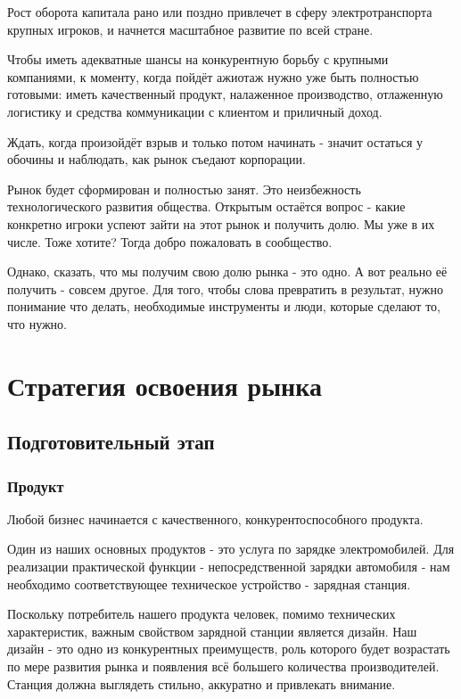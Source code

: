 \documentclass[a4paper,12pt]{report}
\begin{document}
Рост оборота капитала рано или поздно привлечет в сферу электротранспорта крупных игроков, и начнется масштабное развитие по всей стране.

Чтобы иметь адекватные шансы на конкурентную борьбу с крупными компаниями, к моменту, когда пойдёт ажиотаж нужно уже быть полностью готовыми: иметь качественный продукт, налаженное производство, отлаженную логистику и средства коммуникации с клиентом и приличный доход. 

Ждать, когда произойдёт взрыв и только потом начинать - значит остаться у обочины и наблюдать, как рынок съедают корпорации.

Рынок будет сформирован и полностью занят. Это неизбежность технологического развития общества. Открытым остаётся вопрос - какие конкретно игроки успеют зайти на этот рынок и получить долю. Мы уже в их числе. Тоже хотите? Тогда добро пожаловать в сообщество. 

Однако, сказать, что мы получим свою долю рынка - это одно. А вот реально её получить - совсем другое. Для того, чтобы слова превратить в результат, нужно понимание что делать, необходимые инструменты и люди, которые сделают то, что нужно. 


\chapter{Стратегия освоения рынка}

\section{Подготовительный этап}
\subsection{Продукт}

Любой бизнес начинается с качественного, конкурентоспособного продукта. 

Один из наших основных продуктов - это услуга по зарядке электромобилей. Для реализации практической функции - непосредственной зарядки автомобиля - нам необходимо соответствующее техническое устройство - зарядная станция. 

Поскольку потребитель нашего продукта человек, помимо технических характеристик, важным свойством зарядной станции является дизайн. Наш дизайн - это одно из конкурентных преимуществ, роль которого будет возрастать по мере развития рынка и появления всё большего количества производителей. Станция должна выглядеть стильно, аккуратно и привлекать внимание. 
\end{document}
